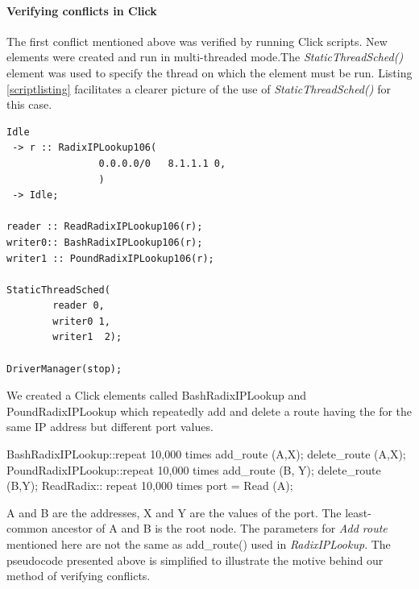 \documentclass[12pt,a4paper]{article}
\begin{document}
\paragraph{Verifying conflicts in Click}
The first conflict mentioned above was verified by running Click scripts. New elements were created and run in multi-threaded mode.The \emph{StaticThreadSched()} element was used to specify the thread on which the element must be run. Listing \ref{scriptlisting} facilitates a clearer picture of the use of \emph{StaticThreadSched()} for this case.
\begin{lstlisting}[caption = Click script for verifying reader-updater conflicts, label=scriptlisting]
Idle
 -> r :: RadixIPLookup106(
                0.0.0.0/0   8.1.1.1 0,
                ) 
 -> Idle;

reader :: ReadRadixIPLookup106(r);
writer0:: BashRadixIPLookup106(r);
writer1 :: PoundRadixIPLookup106(r);

StaticThreadSched(
        reader 0,
        writer0 1,
        writer1  2);

DriverManager(stop);
\end{lstlisting}
We created a Click elements called BashRadixIPLookup and PoundRadixIPLookup which repeatedly add and delete a route having the for the same IP address but different port values.
\begin{code}
  BashRadixIPLookup::repeat 10,000 times {
    add_route (A,X);
    delete_route (A,X);
  }
  PoundRadixIPLookup::repeat 10,000 times {
    add_route (B, Y);
    delete_route (B,Y);
  } 
  ReadRadix:: repeat 10,000 times {
    port = Read (A);
  }
\end{code}
A and B are the addresses, X and Y are the values of the port. The least-common ancestor of A and B is the root node. The parameters for \emph{Add route} mentioned here are not the same as add\_route() used in \emph{RadixIPLookup}. The pseudocode presented above is simplified to illustrate the motive behind our method of verifying conflicts.
\end{document}
